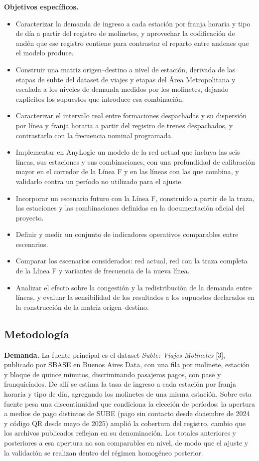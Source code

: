 \documentclass{article}
\begin{document}
\textbf{Objetivos específicos.}
\begin{itemize}
  \item Caracterizar la demanda de ingreso a cada estación por franja horaria y tipo de día a partir del
    registro de molinetes, y aprovechar la codificación de andén que ese registro contiene para
    contrastar el reparto entre andenes que el modelo produce.
  \item Construir una matriz origen--destino a nivel de estación, derivada de las etapas de subte del
    dataset de viajes y etapas del Área Metropolitana y escalada a los niveles de demanda medidos por
    los molinetes, dejando explícitos los supuestos que introduce esa combinación.
  \item Caracterizar el intervalo real entre formaciones despachadas y su dispersión por línea y franja
    horaria a partir del registro de trenes despachados, y contrastarlo con la frecuencia nominal
    programada.
  \item Implementar en AnyLogic un modelo de la red actual que incluya las seis líneas, sus estaciones y
    sus combinaciones, con una profundidad de calibración mayor en el corredor de la Línea F y en las
    líneas con las que combina, y validarlo contra un período no utilizado para el ajuste.
  \item Incorporar un escenario futuro con la Línea F, construido a partir de la traza, las estaciones y
    las combinaciones definidas en la documentación oficial del proyecto.
  \item Definir y medir un conjunto de indicadores operativos comparables entre escenarios.
  \item Comparar los escenarios considerados: red actual, red con la traza completa de la Línea F y
    variantes de frecuencia de la nueva línea.
  \item Analizar el efecto sobre la congestión y la redistribución de la demanda entre líneas, y evaluar
    la sensibilidad de los resultados a los supuestos declarados en la construcción de la matriz
    origen--destino.
\end{itemize}

\subsection{Metodología}

\textbf{Demanda.} La fuente principal es el dataset \textit{Subte: Viajes Molinetes} [3], publicado por
SBASE en Buenos Aires Data, con una fila por molinete, estación y bloque de quince minutos, discriminando
pasajeros pagos, con pase y franquiciados. De allí se estima la tasa de ingreso a cada estación por franja
horaria y tipo de día, agregando los molinetes de una misma estación. Sobre esta fuente pesa una
discontinuidad que condiciona la elección de períodos: la apertura a medios de pago distintos de SUBE (pago sin contacto desde diciembre de 2024 y código QR desde mayo de 2025) amplió la cobertura del registro, cambio que los archivos
publicados reflejan en su denominación. Los totales anteriores y posteriores a esa apertura no son
comparables en nivel, de modo que el ajuste y la validación se realizan dentro del régimen homogéneo
posterior.
\end{document}
